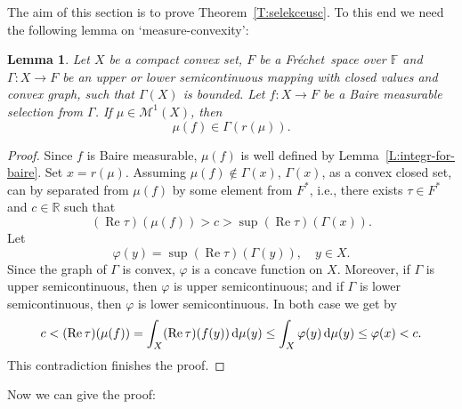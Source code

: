 \documentclass{amsart}
\numberwithin{equation}{section}
\newtheorem{lemma}[thm]{Lemma}
\theoremstyle{definition}
\def\M{\mathcal M}
\def\ef{\mathbb F}
\def\er{\mathbb R}
\def\di{\,\mbox{\rm d}}
\renewcommand{\Re}{\operatorname{Re}}
\newcommand{\fr}{Fr\'echet\ }
\begin{document}
The aim of this section is to prove Theorem~\ref{T:selekceusc}. To this end we need the following lemma on `measure-convexity':

\begin{lemma}
\label{L:sel-convex}
Let $X$ be a compact convex set, $F$ be a \fr space over $\ef$ and $\Gamma\colon X\to F$ be an upper or lower semicontinuous mapping with closed values and convex graph, such that $\Gamma(X)$ is bounded. Let $f\colon X\to F$ be a Baire
measurable selection from $\Gamma$. If $\mu\in\M^1(X)$, then
\[
\mu(f)\in \Gamma(r(\mu)).
\]
\end{lemma}

\begin{proof}
Since $f$ is Baire measurable, $\mu(f)$ is well defined by Lemma~\ref{L:integr-for-baire}. Set $x=r(\mu)$. Assuming $\mu(f)\notin \Gamma(x)$, $\Gamma(x)$, as a convex closed set, can by separated from $\mu(f)$ by some element from $F^*$, i.e.,
there exists $\tau\in F^*$ and $c\in\er$ such that
\[
(\Re \tau)(\mu(f))>c>\sup (\Re \tau)(\Gamma(x)).
\]
Let
\[
\varphi(y)=\sup (\Re \tau)(\Gamma(y)),\quad y\in X.
\]
Since the graph of $\Gamma$ is convex, $\varphi$ is a  concave function on $X$. Moreover, if $\Gamma$ is upper semicontinuous, then $\varphi$ is upper semicontinuous; and if $\Gamma$ is lower semicontinuous, then $\varphi$ is lower semicontinuous.
 In both case we get by  \cite[Proposition 4.7]{lmns}
\[
c<(\Re \tau)(\mu(f))=\int_X (\Re \tau)(f(y))\di \mu(y)\le \int_X \varphi(y)\di\mu(y)\le \varphi(x)<c.
\]
This contradiction finishes the proof.
\end{proof}

Now we can give the proof:
\end{document}
